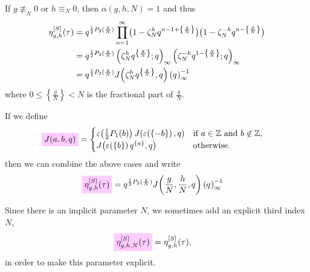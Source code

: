 \documentclass{article}
\begin{document}
\begin{Definition}
If $g\not\equiv_N 0$ or $h\equiv_N 0$, then $\alpha(g,h,N)=1$ and thus
\begin{align*}
  \eta_{g,h}^{[S]}(\tau)
  &=
  q^{\frac{1}{2} P_2(\frac{g}{N})}
  \prod_{n=1}^\infty
    \bigl(1-\zeta_N^h q^{n-1 + \left\{\frac{g}{N}\right\}}\bigr)
    \bigl(1-\zeta_N^{-h} q^{n - \left\{\frac{g}{N}\right\}}\bigr)
  \notag\\
  &=
  q^{\frac{1}{2} P_2(\frac{g}{N})}
  \left( \zeta_N^h q^{\left\{\frac{g}{N}\right\}};q \right)_{\infty}
  \left( \zeta_N^{-h} q^{1-\left\{\frac{g}{N}\right\}};q \right)_{\infty}
  \notag\\
  &=
  q^{\frac{1}{2} P_2(\frac{g}{N})}
    J\!\left(\zeta_N^h q^{\left\{\frac{g}{N}\right\}},q\right)
    \left({q}^{}\right)_{\infty}^{-1}
\end{align*}
where $0\le\left\{\frac{g}{N}\right\}<N$ is the fractional part of
$\frac{g}{N}$.


If we define
\begin{align}
  \defineNotation[Jacobi-a-b-q]{\jacobiAlpha{a}{b}{q}}
  &=
    \begin{cases}
      \unityPower{\frac{1}{2} P_1(b)}
      \jacobiFunction{\unityPower{\left\{-b\right\}}}{q} & \text{if $a\in\setZ$ and
        $b\not\in\setZ$},
      \\
      \jacobiFunction{\unityPower{\left\{b\right\}}q^{\{a\}}}{q} & \text{otherwise.}
    \end{cases}
  \label{eq:Jacobi_a-b-q}
\end{align}
then we can combine the above cases and write
\begin{align}
  \defineNotation[eta-g-h-tau-Schoeneberg]{\eta_{g,h}^{[S]}(\tau)}
  &=
  q^{\frac{1}{2} P_2(\frac{g}{N})}
    \jacobiAlpha{\frac{g}{N}}{\frac{h}{N}}{q}
    \eulerFunction{}^{-1}
  \label{eq:eta_g-h^[S](tau)}
\end{align}








Since there is an implicit parameter $N$, we sometimes add an explicit
third index $N$, \ie
\begin{align}
  \label{eq:eta_g-h-N^[S](tau)}
  \defineNotation[eta-g-h-N-tau-Schoeneberg]{\eta_{g,h,N}^{[S]}(\tau)}
  &=
  \eta_{g,h}^{[S]}(\tau),
\end{align}
in order to make this parameter explicit.
\end{Definition}
\end{document}
